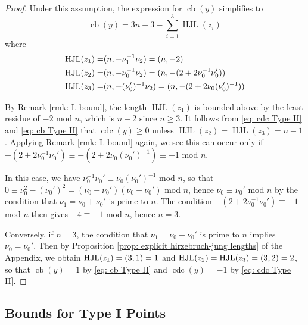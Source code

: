 \documentclass[12pt]{amsart}
\numberwithin{equation}{section}
\theoremstyle{definition}
\let\L\relax
\DeclareMathOperator{\cb}{cb}
\DeclareMathOperator{\cdc}{cdc}
\DeclareMathOperator{\HJL}{HJL}
\DeclareMathOperator{\L}{L}
\begin{document}
\begin{proof}
    Under this assumption, the expression for $\cb(y)$ simplifies to
    \begin{equation}\label{eq: cb Type II}
        \cb(y)=3n-3-\sum_{i=1}^3\HJL(z_i)
    \end{equation}
    where
    \begin{align*}
    \HJL(z_1)=&\L(n,-\nu_1^{-1}\nu_2)=\L(n,-2)\\
    \HJL(z_2)=&\L(n,-\nu_0^{-1}\nu_2)=\L(n,-(2+2\nu_0^{-1}\nu_0'))\\
    \HJL(z_3)=&\L(n,-(\nu_0')^{-1}\nu_2)=\L(n,-(2+2\nu_0(\nu_0')^{-1}))
    \end{align*}

    By Remark \ref{rmk: L bound}, the length $\HJL(z_1)$ is bounded above by the least residue of $-2$ mod $n$, which is $n-2$ since $n\geq 3$. It follows from \eqref{eq: cdc Type II} and \eqref{eq: cb Type II} that $\cdc(y)\geq 0$ unless $\HJL(z_2)=\HJL(z_3)=n-1$. Applying Remark \ref{rmk: L bound} again, we see this can occur only if $-(2+2\nu_0^{-1}\nu_0')\equiv-(2+2\nu_0(\nu_0')^{-1})\equiv-1$ mod $n$.
    
    In this case, we have $\nu_0^{-1}\nu_0'\equiv\nu_0(\nu_0')^{-1}$ mod $n$, so that $0\equiv \nu_0^2-(\nu_0')^2=(\nu_0+\nu_0')(\nu_0-\nu_0')$ mod $n$, hence $\nu_0\equiv \nu_0'$ mod $n$ by the condition that $\nu_1=\nu_0+\nu_0'$ is prime to $n$. The condition $-(2+2\nu_0^{-1}\nu_0')\equiv-1$ mod $n$ then gives $-4\equiv-1$ mod $n$, hence $n=3$.

    Conversely, if $n=3$, the condition that $\nu_1=\nu_0+\nu_0'$ is prime to $n$ implies $\nu_0=\nu_0'$. Then by Proposition \ref{prop: explicit hirzebruch-jung lengths} of the Appendix, we obtain $\HJL(z_1)=\L(3,1)=1 $ and $\HJL(z_2)=\HJL(z_3)=\L(3,2)=2$, so that $\cb(y)=1$ by \eqref{eq: cb Type II} and $\cdc(y)=-1$ by \eqref{eq: cdc Type II}.
\end{proof}

\subsection{Bounds for Type I Points}
\end{document}
